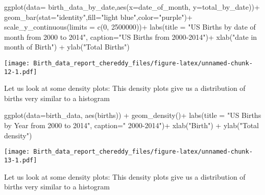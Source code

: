 \documentclass[
]{article}
\newenvironment{Shaded}{\begin{snugshade}}{\end{snugshade}}
\newcommand{\AttributeTok}[1]{\textcolor[rgb]{0.77,0.63,0.00}{#1}}
\newcommand{\DecValTok}[1]{\textcolor[rgb]{0.00,0.00,0.81}{#1}}
\newcommand{\FunctionTok}[1]{\textcolor[rgb]{0.00,0.00,0.00}{#1}}
\newcommand{\NormalTok}[1]{#1}
\newcommand{\SpecialCharTok}[1]{\textcolor[rgb]{0.00,0.00,0.00}{#1}}
\newcommand{\StringTok}[1]{\textcolor[rgb]{0.31,0.60,0.02}{#1}}
\begin{document}
\begin{Shaded}
\begin{Highlighting}[]
\FunctionTok{ggplot}\NormalTok{(}\AttributeTok{data=}\NormalTok{ birth\_data\_by\_date,}\FunctionTok{aes}\NormalTok{(}\AttributeTok{x=}\NormalTok{date\_of\_month, }\AttributeTok{y=}\NormalTok{total\_by\_date))}\SpecialCharTok{+}
  \FunctionTok{geom\_bar}\NormalTok{(}\AttributeTok{stat=}\StringTok{"identity"}\NormalTok{,}\AttributeTok{fill=}\StringTok{"light blue"}\NormalTok{,}\AttributeTok{color=}\StringTok{"purple"}\NormalTok{)}\SpecialCharTok{+}
  \FunctionTok{scale\_y\_continuous}\NormalTok{(}\AttributeTok{limits =} \FunctionTok{c}\NormalTok{(}\DecValTok{0}\NormalTok{, }\DecValTok{2500000}\NormalTok{))}\SpecialCharTok{+}
  \FunctionTok{labs}\NormalTok{(}\AttributeTok{title =} \StringTok{"US Births by date of month from 2000 to 2014"}\NormalTok{,}
       \AttributeTok{caption=}\StringTok{"US Births from 2000{-}2014"}\NormalTok{)}\SpecialCharTok{+}
  \FunctionTok{xlab}\NormalTok{(}\StringTok{"date in month of Birth"}\NormalTok{) }\SpecialCharTok{+}
  \FunctionTok{ylab}\NormalTok{(}\StringTok{"Total Births"}\NormalTok{)}
\end{Highlighting}
\end{Shaded}

\texttt{[image: Birth\_data\_report\_chereddy\_files/figure-latex/unnamed-chunk-12-1.pdf]}

Let us look at some density plots: This density plots give us a
distribution of births very similar to a histogram

\begin{Shaded}
\begin{Highlighting}[]
\FunctionTok{ggplot}\NormalTok{(}\AttributeTok{data=}\NormalTok{birth\_data, }\FunctionTok{aes}\NormalTok{(births)) }\SpecialCharTok{+} 
  \FunctionTok{geom\_density}\NormalTok{()}\SpecialCharTok{+}
  \FunctionTok{labs}\NormalTok{(}\AttributeTok{title =} \StringTok{"US Births by Year from 2000 to 2014"}\NormalTok{,}
       \AttributeTok{caption=}\StringTok{" 2000{-}2014"}\NormalTok{)}\SpecialCharTok{+}
  \FunctionTok{xlab}\NormalTok{(}\StringTok{"Birth"}\NormalTok{) }\SpecialCharTok{+}
  \FunctionTok{ylab}\NormalTok{(}\StringTok{"Total density"}\NormalTok{)}
\end{Highlighting}
\end{Shaded}

\texttt{[image: Birth\_data\_report\_chereddy\_files/figure-latex/unnamed-chunk-13-1.pdf]}

Let us look at some density plots: This density plots give us a
distribution of births very similar to a histogram
\end{document}
